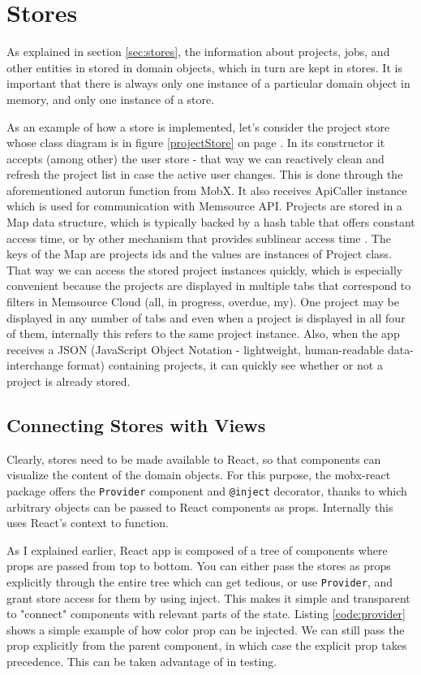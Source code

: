 \section{Stores}

As explained in section \ref{sec:stores}, the information about projects, jobs, and other entities in stored in domain objects, which in turn are kept in stores. It is important that there is always only one instance of a particular domain object in memory, and only one instance of a store.

As an example of how a store is implemented, let's consider the project store whose class diagram is in figure \ref{projectStore} on page \pageref{projectStore}. In its constructor it accepts (among other) the user store - that way we can reactively clean and refresh the project list in case the active user changes. This is done through the aforementioned autorun function from MobX. It also receives ApiCaller instance which is used for communication with Memsource API. Projects are stored in a Map data structure, which is typically backed by a hash table that offers constant access time, or by other mechanism that provides sublinear access time \cite{ecma:map}. The keys of the Map are projects ids and the values are instances of Project class. That way we can access the stored project instances quickly, which is especially convenient because the projects are displayed in multiple tabs that correspond to filters in Memsource Cloud (all, in progress, overdue, my). One project may be displayed in any number of tabs and even when a project is displayed in all four of them, internally this refers to the same project instance. Also, when the app receives a JSON  (JavaScript Object Notation - lightweight, human-readable data-interchange format) containing projects, it can quickly see whether or not a project is already stored.


\subsection{Connecting Stores with Views}

Clearly, stores need to be made available to React, so that components can visualize the content of the domain objects. For this purpose, the mobx-react package offers the \texttt{Provider} component and \texttt{@inject} decorator, thanks to which arbitrary objects can be passed to React components as props. Internally this uses React's context to function.

As I explained earlier, React app is composed of a tree of components where props are passed from top to bottom. You can either pass the stores as props explicitly through the entire tree which can get tedious, or use \texttt{Provider}, and grant store access for them by using inject. This makes it simple and transparent to "connect" components with relevant parts of the state. Listing \ref{code:provider} shows a simple example of how color prop can be injected. We can still pass the prop explicitly from the parent component, in which case the explicit prop takes precedence. This can be taken advantage of in testing.

